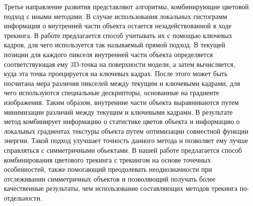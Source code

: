 Третье направление развития представляют алгоритмы, комбинирующие
цветовой подход с иными методами.
В случае использования локальных гистограмм информация о внутренней части
объекта остается незадействованной в ходе трекинга.
В работе \cite{Zhong2018} предлагается способ учитывать их с помощью ключевых
кадров, для чего используется так называемый прямой подход.
В текущей позиции для каждого пикселя внутренней части объекта
определяется соответствующая ему 3D-точка на поверхности модели,
а затем вычисляется, куда эта точка проецируется на ключевых кадрах.
После этого может быть посчитана мера различия пикселей между текущим и
ключевыми кадрами, для чего используются специальные дескрипторы, основанные на
градиенте изображения.
Таким образом, внутренние части объекта выравниваются путем минимизации
различий между текущим и ключевыми кадрами.
В результате метод \cite{Zhong2018} комбинирует информацию о статистике цветов
объекта и информацию о локальных градиентах текстуры объекта путем оптимизации
совместной функции энергии.
Такой подход улучшает точность данного метода и позволяет ему лучше справляться
с симметричными объектами.
В нашей работе предлагается способ комбинирования цветового трекинга с
трекингом на основе точечных особенностей, также помогающий преодолевать
неоднозначности при отслеживании симметричных объектов и позволяющий получать
более качественные результаты, чем использование составляющих методов
трекинга по-отдельности.
